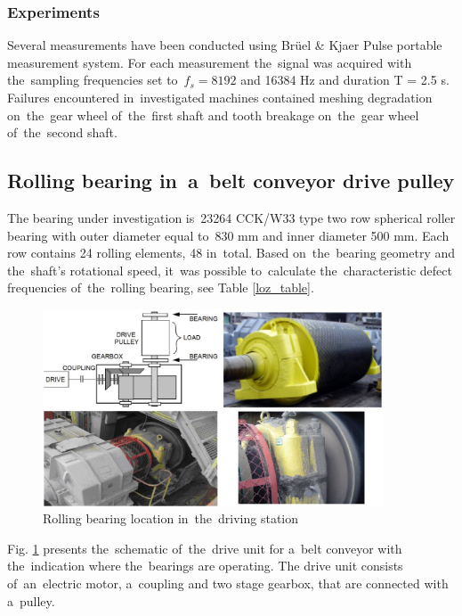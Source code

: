 \subsubsection{Experiments}
Several measurements have been conducted using Br{\"u}el \& Kjaer Pulse portable measurement system. For each measurement the~signal was acquired with the~sampling frequencies set to~$f_s = 8192$ and 16384 Hz and duration T = 2.5 s. Failures encountered in~investigated machines contained meshing degradation on~the~gear wheel of~the~first shaft and tooth breakage on~the~gear wheel of~the~second shaft.

\subsection{Rolling bearing in~a~belt conveyor drive pulley}

The bearing under investigation is~23264 CCK/W33 type two row spherical roller bearing with outer diameter equal to~830 mm and inner diameter 500 mm. Each row contains 24 rolling elements, 48 in~total. Based on~the~bearing geometry and the~shaft’s rotational speed, it~was possible to~calculate the~characteristic defect frequencies of~the~rolling bearing, see Table \ref{loz_table}.

\begin{figure}[ht!]
\centering
\includegraphics[width=0.9\textwidth]{wykresy/gb.PNG}
\caption{Rolling bearing location in~the~driving station}
\label{fig:gb}
\end{figure}

Fig. \ref{fig:gb} presents the~schematic of~the~drive unit for a~belt conveyor with the~indication where the~bearings are operating. The drive unit consists of~an~electric motor, a~coupling and two stage gearbox, that are connected with a~pulley.

